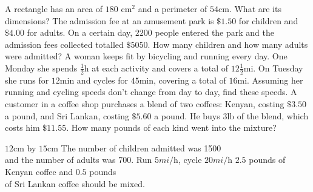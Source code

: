 \begin{Exercise}[title={Word Problems},label=ex15]
	\Question A rectangle has an area of $180\text{ cm}^{2}$ and a perimeter of $54 \mbox{cm}$. What are its dimensions? 
	\Question The admission fee at an amusement park is $ \$1.50$ for children and $ \$4.00$ for adults. On a certain day, $2200$ people entered the park and the admission fees collected totalled $ \$5050$. How many children and how many adults were admitted? 
	\Question A woman keeps fit by bicycling and running every day. One Monday she spends $\frac{1}{2} \mbox{h}$ at each activity and covers a total of $12\frac{1}{2} \mbox{mi}$. On Tuesday she runs for $12 \mbox{min}$ and cycles for $45 \mbox{min}$, covering a total of $16 \mbox{mi}$. Assuming her running and cycling speeds don't
	change from day to day, find these speeds.
	\Question A customer
	in a coffee shop purchases a blend of two coffees: Kenyan, costing $ \$3.50$ a pound, and Sri Lankan, costing $ \$5.60$ a pound. He buys $3 \mbox{lb}$ of the blend, which costs him $ \$11.55$. How many pounds of each kind went into the mixture?
\end{Exercise}%
\begin{Answer}[ref={ex15}]		
	\Question $12 \mbox{cm}$ by $15 \mbox{cm}$
	\Question The number of children admitted was 1500\\ and the number
	of adults was 700.
	\Question Run $5 mi/\mbox{h}$, cycle $20 mi/\mbox{h}$ 
	\Question $2.5$ pounds of Kenyan coffee and $0.5$ pounds\\ of Sri Lankan coffee should be mixed. 
\end{Answer}%



